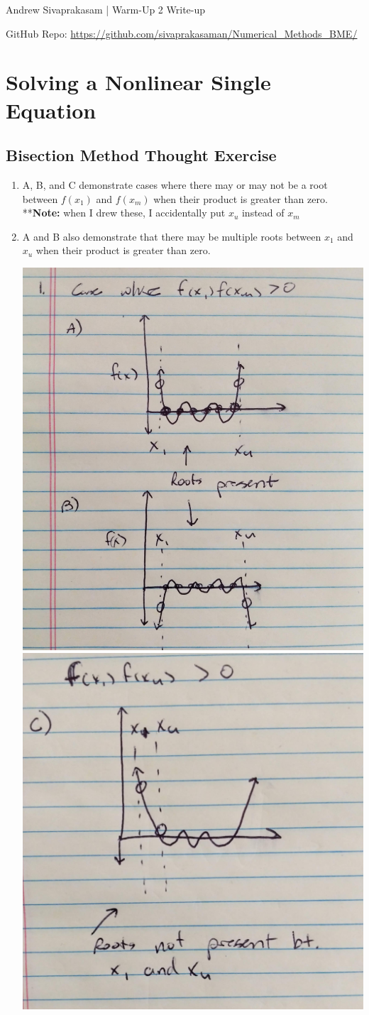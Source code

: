 \documentclass[12pt]{extarticle}
\begin{document}
{\Large Andrew Sivaprakasam | Warm-Up 2 Write-up}

GitHub Repo: \url{https://github.com/sivaprakasaman/Numerical_Methods_BME/} 

\section{Solving a Nonlinear Single Equation}


\subsection{Bisection Method Thought Exercise}

\begin{enumerate}
\item A, B, and C demonstrate cases where there may or may not be a root between $f(x_1)$ and $f(x_m)$ when their product is greater than zero. 
**\textbf{Note:} when I drew these, I accidentally put $x_u$ instead of $x_m$
\item A and B also demonstrate that there may be multiple roots between $x_1$ and $x_u$ when their product is greater than zero.
\\
\begin{center}
\includegraphics[width = .45\textwidth]{pic_1}
\includegraphics[width = .45\textwidth]{pic_2}
\end{center}


\end{enumerate}
\end{document}
